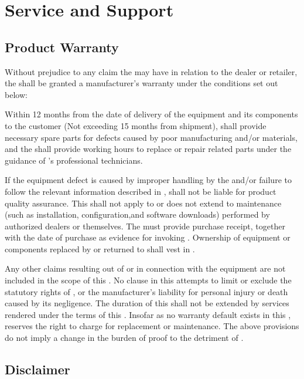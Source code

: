 \chapter{Service and Support}

\section{Product Warranty}
\label{sec:产品质量保证书}

Without prejudice to any claim the {\User} may have in relation to the dealer or retailer,  the {\User} shall be granted a manufacturer's warranty under the conditions set out below:

Within 12 months from the date of delivery of the equipment and its components to the customer (Not exceeding 15 months from shipment), {\TheCompany} shall provide necessary spare parts for defects caused by poor manufacturing and/or materials, and the {\User} shall provide working hours to replace or repair related parts under the guidance of {\TheCompany}'s professional technicians.

If the equipment defect is caused by improper handling by the {\User} and/or failure to follow the relevant information described in {\ThisBook}, {\TheCompany} shall not be liable for product quality assurance. This {\TheSec} shall not apply to or does not extend to maintenance (such as installation, configuration,and software downloads) performed by authorized dealers or {\Users} themselves. The {\User} must provide purchase receipt, together with the date of purchase as evidence for invoking {\TheSec}. Ownership of equipment or components replaced by or returned to {\TheCompany} shall vest in {\TheCompany}.

Any other claims resulting out of or in connection with the equipment are not included in the scope of this {\TheSec}. No clause in this {\TheSec} attempts to limit or exclude the statutory rights of {\Users}, or the manufacturer’s liability for personal injury or death caused by its negligence. The duration of this {\TheSec} shall not be extended by services rendered under the terms of this {\TheSec}. Insofar as no warranty default exists in this {\TheSec}, {\TheCompany} reserves the right to charge {\Users} for replacement or maintenance. The above provisions do not imply a change in the burden of proof to the detriment of {\Users}.

\section{Disclaimer}

